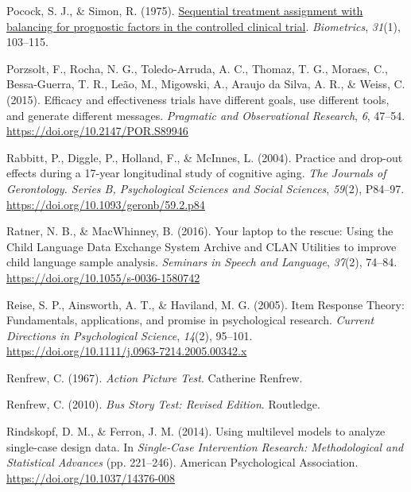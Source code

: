\documentclass{krantz}
\newlength{\cslhangindent}
\newlength{\cslentryspacingunit} %
\newenvironment{CSLReferences}[2] %
{%
\setlength{\parindent}{0pt}
\ifodd #1
\let\oldpar\par
\def\par{\hangindent=\cslhangindent\oldpar}
\fi
\setlength{\parskip}{#2\cslentryspacingunit}
}%
{}
\begin{document}
\begin{CSLReferences}{1}{0}
\leavevmode{}%
Pocock, S. J., \& Simon, R. (1975). \href{https://www.ncbi.nlm.nih.gov/pubmed/1100130}{Sequential treatment assignment with balancing for prognostic factors in the controlled clinical trial}. \emph{Biometrics}, \emph{31}(1), 103--115.

\leavevmode{}%
Porzsolt, F., Rocha, N. G., Toledo-Arruda, A. C., Thomaz, T. G., Moraes, C., Bessa-Guerra, T. R., Leão, M., Migowski, A., Araujo da Silva, A. R., \& Weiss, C. (2015). Efficacy and effectiveness trials have different goals, use different tools, and generate different messages. \emph{Pragmatic and Observational Research}, \emph{6}, 47--54. \url{https://doi.org/10.2147/POR.S89946}

\leavevmode{}%
Rabbitt, P., Diggle, P., Holland, F., \& McInnes, L. (2004). Practice and drop-out effects during a 17-year longitudinal study of cognitive aging. \emph{The Journals of Gerontology. Series B, Psychological Sciences and Social Sciences}, \emph{59}(2), P84--97. \url{https://doi.org/10.1093/geronb/59.2.p84}

\leavevmode{}%
Ratner, N. B., \& MacWhinney, B. (2016). Your laptop to the rescue: {Using} the {Child Language Data Exchange System Archive} and {CLAN Utilities} to improve child language sample analysis. \emph{Seminars in Speech and Language}, \emph{37}(2), 74--84. \url{https://doi.org/10.1055/s-0036-1580742}

\leavevmode{}%
Reise, S. P., Ainsworth, A. T., \& Haviland, M. G. (2005). Item {Response Theory}: {Fundamentals}, applications, and promise in psychological research. \emph{Current Directions in Psychological Science}, \emph{14}(2), 95--101. \url{https://doi.org/10.1111/j.0963-7214.2005.00342.x}

\leavevmode{}%
Renfrew, C. (1967). \emph{Action {Picture Test}}. {Catherine Renfrew}.

\leavevmode{}%
Renfrew, C. (2010). \emph{Bus {Story Test}: {Revised Edition}}. {Routledge}.

\leavevmode{}%
Rindskopf, D. M., \& Ferron, J. M. (2014). Using multilevel models to analyze single-case design data. In \emph{Single-{Case Intervention Research}: {Methodological} and {Statistical Advances}} (pp. 221--246). {American Psychological Association}. \url{https://doi.org/10.1037/14376-008}


\end{CSLReferences}
\end{document}
